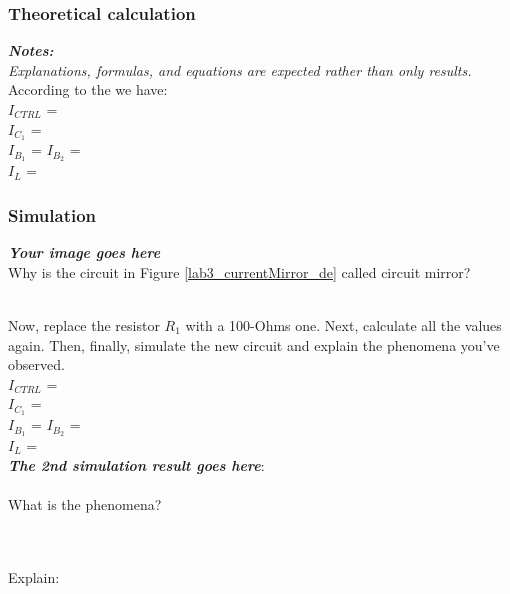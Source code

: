 \subsubsection{Theoretical calculation}
\textit{\textbf{Notes:}}\\
\textit{Explanations, formulas, and equations are expected rather than only results.}
\bigskip\\
According to the \dotfill we have: \bigskip\\
$I_{CTRL}$ = \dotfill \bigskip \\
$I_{C_1}$ = \dotfill \bigskip \\
$I_{B_1}$ = $I_{B_2}$ = \dotfill \bigskip \\
$I_L$ = \dotfill \bigskip \\

\subsubsection{Simulation}
\textbf{\textit{Your image goes here}}
\vspace{8cm}
\\
Why is the circuit in Figure \ref{lab3_currentMirror_de} called circuit mirror?
\dotfill\bigskip\par\mbox{}\dotfill\bigskip\\
Now, replace the resistor $R_1$ with a 100-Ohms one. Next, calculate all the values again. Then, finally, simulate the new circuit and explain the phenomena you've observed.\bigskip\\
$I_{CTRL}$ = \dotfill \bigskip \\
$I_{C_1}$ = \dotfill \bigskip \\
$I_{B_1}$ = $I_{B_2}$ = \dotfill \bigskip \\
$I_L$ = \dotfill \bigskip \\
\newpage
\textbf{\textit{The 2nd simulation result goes here}}:\\
\vspace{8cm}
\\
What is the phenomena? \bigskip\\
\dotfill\bigskip\par\mbox{}\dotfill\bigskip\\
\\
Explain:
\begin{center}
    \dotfill\bigskip\par\mbox{}\dotfill\bigskip\\
    \dotfill\bigskip\par\mbox{}\dotfill\bigskip\\
    \dotfill\bigskip\par\mbox{}\dotfill\bigskip\\
    \dotfill\bigskip\par\mbox{}\dotfill\bigskip\\
    \dotfill\bigskip\par\mbox{}\dotfill\bigskip\\
\end{center}

